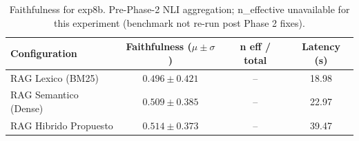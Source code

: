 \begin{table}[htbp]
\centering
\caption{Faithfulness for exp8b. Pre-Phase-2 NLI aggregation; n\_effective unavailable for this experiment (benchmark not re-run post Phase 2 fixes).}
\label{tab:exp8b-faithfulness-phase3}
\begin{tabular}{lccc}
\toprule
Configuration & Faithfulness ($\mu \pm \sigma$) & n eff / total & Latency (s) \\
\midrule
RAG Lexico (BM25) & $0.496 \pm 0.421$ & -- & 18.98 \\
RAG Semantico (Dense) & $0.509 \pm 0.385$ & -- & 22.97 \\
RAG Hibrido Propuesto & $0.514 \pm 0.373$ & -- & 39.47 \\
\bottomrule
\end{tabular}
\end{table}

